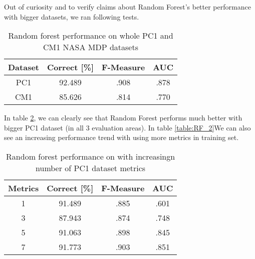 Out of curiosity and to verify claims about Random Forest's better performance with bigger datasets, we ran following tests.

\begin{table}[h!]
\centering
\begin{tabular}{ |c|c|c|c| }
 \hline
 \textbf{Dataset} & \textbf{Correct [\%]} & \textbf{F-Measure} & \textbf{AUC}  \\
 \hline
  PC1 & 92.489 & .908 & .878    \\
 \hline
 CM1 & 85.626 & .814 & .770    \\
 \hline

\end{tabular}
\caption{Random forest performance on whole PC1 and CM1 NASA MDP datasets}
\label{table:RF_1}
\end{table}

In table \ref{table:RF_1}, we can clearly see that Random Forest performs much better with bigger PC1 dataset (in all 3 evaluation areas). In table \ref{table:RF_2}We can also see an increasing performance trend with using more metrics in training set.

\begin{table}[h!]
\centering
\begin{tabular}{ |c|c|c|c| }
 \hline
 \textbf{Metrics} & \textbf{Correct [\%]} & \textbf{F-Measure} & \textbf{AUC}  \\
 \hline
  1 & 91.489 & .885 & .601    \\
 \hline
 3 & 87.943 & .874 & .748    \\
 \hline
  5 & 91.063 & .898 & .845    \\
 \hline
 7 & 91.773 & .903 & .851    \\
 \hline
\end{tabular}
\caption{Random forest performance on with increasingn number of PC1 dataset metrics}
\label{table:RF_1}
\end{table}